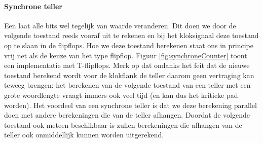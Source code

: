 \paragraph{Synchrone teller}
Een  laat alle bits wel tegelijk van waarde veranderen. Dit doen we door de volgende toestand reeds vooraf uit te rekenen en bij het kloksignaal deze toestand op te slaan in de flipflops. Hoe we deze toestand berekenen staat ons in principe vrij net als de keuze van het type flipflop. Figuur \ref{fig:synchroneCounter} toont een implementatie met T-flipflops. Merk op dat ondanks het feit dat de nieuwe toestand berekend wordt voor de klokflank de teller daarom geen vertraging kan teweeg brengen: het berekenen van de volgende toestand van een teller met een grote woordlengte vraagt immers ook veel tijd (en kan dus het kritieke pad worden). Het voordeel van een synchrone teller is dat we deze berekening parallel doen met andere berekeningen die van de teller afhangen. Doordat de volgende toestand ook meteen beschikbaar is zullen berekeningen die afhangen van de teller ook onmiddellijk kunnen worden uitgerekend.
